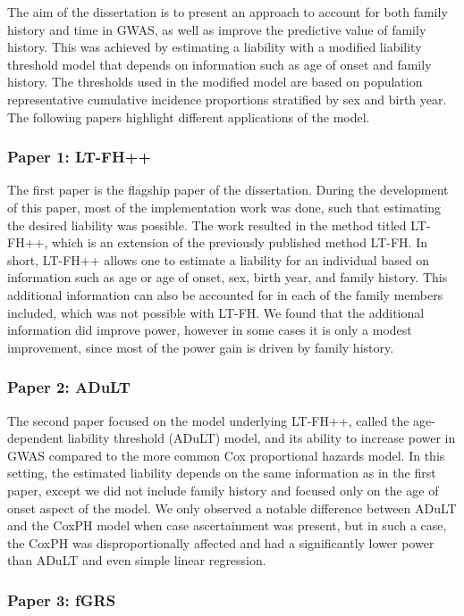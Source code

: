 The aim of the dissertation is to present an approach to account for both family history and time in GWAS, as well as improve the predictive value of family history. This was achieved by estimating a liability with a modified liability threshold model that depends on information such as age of onset and family history. The thresholds used in the modified model are based on population representative cumulative incidence proportions stratified by sex and birth year. The following papers highlight different applications of the model.


\subsubsection{Paper 1: LT-FH++}
The first paper is the flagship paper of the dissertation. During the development of this paper, most of the implementation work was done, such that estimating the desired liability was possible. The work resulted in the method titled LT-FH++, which is an extension of the previously published method LT-FH. In short, LT-FH++ allows one to estimate a liability for an individual based on information such as age or age of onset, sex, birth year, and family history. This additional information can also be accounted for in each of the family members included, which was not possible with LT-FH. We found that the additional information did improve power, however in some cases it is only a modest improvement, since most of the power gain is driven by family history.

\subsubsection{Paper 2: ADuLT}
The second paper focused on the model underlying LT-FH++, called the age-dependent liability threshold (ADuLT) model, and its ability 
to increase power in GWAS compared to the more common Cox proportional hazards model. In this setting, the estimated liability depends 
on the same information as in the first paper, except we did not include family history and focused only on the age of onset aspect of 
the model. We only observed a notable difference between ADuLT and the CoxPH model when case ascertainment was present, but in such a 
case, the CoxPH was disproportionally affected and had a significantly lower power than ADuLT and even simple linear regression.

\subsubsection{Paper 3: fGRS}

